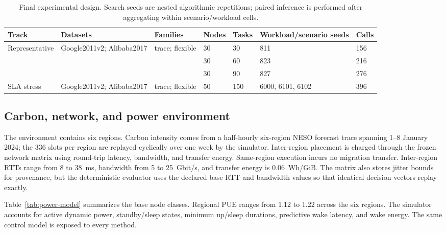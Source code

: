 \documentclass[preprint,12pt]{elsarticle}
\begin{document}
\begin{table}[t]
\centering
\caption{Final experimental design. Search seeds are nested algorithmic repetitions; paired inference is performed after aggregating within scenario/workload cells.}
\label{tab:design}
\scriptsize
\setlength{\tabcolsep}{3pt}
\begin{tabularx}{\textwidth}{p{2.15cm}Y p{1.45cm}C{0.85cm}C{0.85cm}p{2.55cm}C{1.25cm}}
\toprule
Track & Datasets & Families & Nodes & Tasks & Workload/scenario seeds & Calls \\
\midrule
Representative & Google2011v2; Alibaba2017 & trace; flexible & 30 & 30 & 811 & 156 \\
 &  &  & 30 & 60 & 823 & 216 \\
 &  &  & 30 & 90 & 827 & 276 \\
SLA stress & Google2011v2; Alibaba2017 & trace; flexible & 50 & 150 & 6000, 6101, 6102 & 396 \\
\bottomrule
\end{tabularx}
\end{table}

\subsection{Carbon, network, and power environment}

The environment contains six regions. Carbon intensity comes from a half-hourly six-region NESO forecast trace spanning 1--8 January 2024; the 336 slots per region are replayed cyclically over one week by the simulator. Inter-region placement is charged through the frozen network matrix using round-trip latency, bandwidth, and transfer energy. Same-region execution incurs no migration transfer. Inter-region RTTs range from 8 to 38~ms, bandwidth from 5 to 25~Gbit/s, and transfer energy is 0.06~Wh/GiB. The matrix also stores jitter bounds for provenance, but the deterministic evaluator uses the declared base RTT and bandwidth values so that identical decision vectors replay exactly.

Table~\ref{tab:power-model} summarizes the base node classes. Regional PUE ranges from 1.12 to 1.22 across the six regions. The simulator accounts for active dynamic power, standby/sleep states, minimum up/sleep durations, predictive wake latency, and wake energy. The same control model is exposed to every method.
\end{document}
